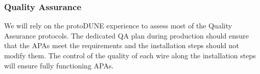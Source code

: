\subsubsection{Quality Assurance}

We will rely on the protoDUNE experience to assess most of the Quality Assurance protocols. The dedicated QA plan during production should ensure that the APAs meet the requirements and the installation steps should not modify them. The control of the quality of each wire along the installation steps will ensure fully functioning APAs.


